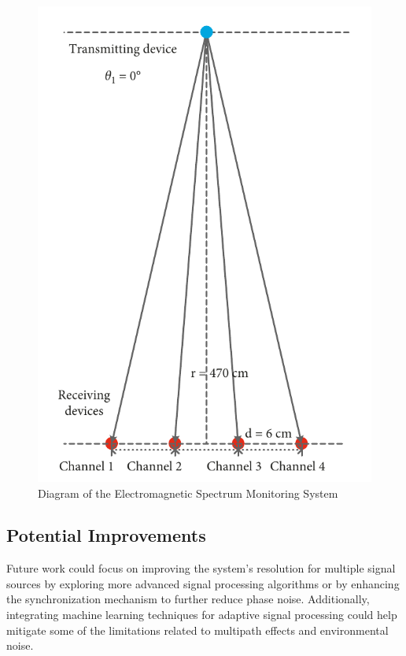 \documentclass{article}
\begin{document}
\begin{figure}[h!]
    \centering
    \includegraphics[width=\textwidth]{figures/doa4.png}
    \caption{Diagram of the Electromagnetic Spectrum Monitoring System}
    \label{fig:blocks}
\end{figure}

\subsection{Potential Improvements}

Future work could focus on improving the system's resolution for multiple signal sources by exploring more advanced signal processing algorithms or by enhancing the synchronization mechanism to further reduce phase noise. Additionally, integrating machine learning techniques for adaptive signal processing could help mitigate some of the limitations related to multipath effects and environmental noise.
\end{document}
